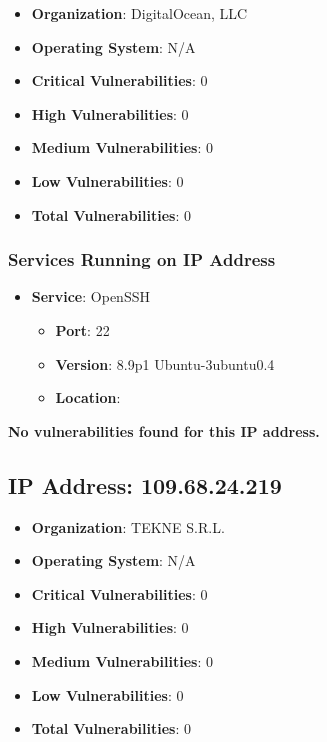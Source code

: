 \documentclass{article}
\begin{document}
\begin{itemize}
    \item \textbf{Organization}: DigitalOcean, LLC
    \item \textbf{Operating System}:  N/A 
    \item \textbf{Critical Vulnerabilities}: 0
    \item \textbf{High Vulnerabilities}: 0
    \item \textbf{Medium Vulnerabilities}: 0
    \item \textbf{Low Vulnerabilities}: 0
    \item \textbf{Total Vulnerabilities}: 0
\end{itemize}

\subsubsection*{Services Running on IP Address}

\begin{itemize}
    
        \item \textbf{Service}: OpenSSH
        \begin{itemize}
            \item \textbf{Port}: 22
            \item \textbf{Version}:  8.9p1 Ubuntu-3ubuntu0.4 
            \item \textbf{Location}: \href{  }{  }
        \end{itemize}
    
\end{itemize}


\textbf{No vulnerabilities found for this IP address.}




\clearpage



\subsection*{IP Address: 109.68.24.219}

\begin{itemize}
    \item \textbf{Organization}: TEKNE S.R.L.
    \item \textbf{Operating System}:  N/A 
    \item \textbf{Critical Vulnerabilities}: 0
    \item \textbf{High Vulnerabilities}: 0
    \item \textbf{Medium Vulnerabilities}: 0
    \item \textbf{Low Vulnerabilities}: 0
    \item \textbf{Total Vulnerabilities}: 0
\end{itemize}
\end{document}
